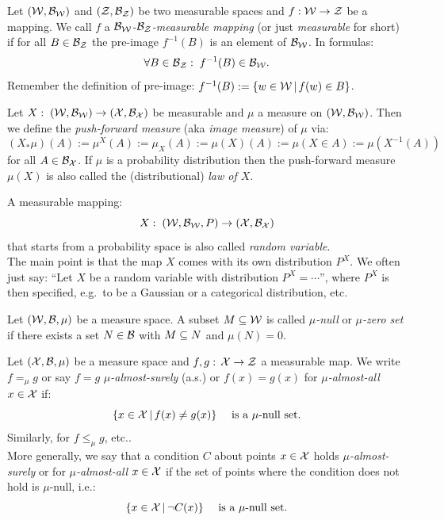 \begin{Def}
    \label{def-measurable-map}
    Let $(\mathcal{W},\mathcal{B}_{\mathcal{W}})$ and $(\mathcal{Z},\mathcal{B}_{\mathcal{Z}})$ be two measurable spaces and $f: \mathcal{W} \to \mathcal{Z}$ be a mapping.
    We call $f$ a \emph{$\mathcal{B}_{\mathcal{W}}$-$\mathcal{B}_{\mathcal{Z}}$-measurable mapping} (or just \emph{measurable} for short) if
    for all $B \in \mathcal{B}_{\mathcal{Z}}$ the pre-image $f^{-1}(B)$ is an element of $\mathcal{B}_{\mathcal{W}}$. In formulas:
    \[\forall B \in \mathcal{B}_{\mathcal{Z}}:\; f^{-1}(B) \in \mathcal{B}_{\mathcal{W}}.\]
    Remember the definition of pre-image: $f^{-1}(B) := \{ w\in \mathcal{W}\,|\, f(w) \in B \}$.
\end{Def}



\begin{Def}
    Let  $X:\; (\mathcal{W},\mathcal{B}_{\mathcal{W}}) \to (\mathcal{X},\mathcal{B}_{\mathcal{X}})$ be measurable and $\mu$ a measure on $(\mathcal{W},\mathcal{B}_{\mathcal{W}})$.
    Then we define the \emph{push-forward measure} (aka \emph{image measure}) of $\mu$ via:
    \[ (X_*\mu)(A):= \mu^X(A) := \mu_X(A) := \mu(X)(A):= \mu(X \in A):= \mu(X^{-1}(A))\]
    for all $A \in \mathcal{B}_{\mathcal{X}}$.
    If $\mu$ is a probability distribution then the push-forward measure $\mu(X)$ is also called the (distributional) \emph{law of $X$}.
\end{Def}


\begin{Def}
    A measurable mapping: \[X:\; (\mathcal{W},\mathcal{B}_{\mathcal{W}},P) \to (\mathcal{X},\mathcal{B}_{\mathcal{X}})\] 
    that starts from a probability space is also called \emph{random variable}.\\
    The main point is that the map $X$ comes with its own distribution $P^X$.
    We often just say: ``Let $X$ be a random variable with distribution $P^X = \cdots$'',
    where $P^X$ is then specified, e.g.\ to be a Gaussian or a categorical distribution, etc.
\end{Def}


\begin{Def}
    Let $(\mathcal{W},\mathcal{B},\mu)$ be a measure space.
    A subset $M \subseteq \mathcal{W}$ is called \emph{$\mu$-null} or \emph{$\mu$-zero set} if there exists a set $N \in \mathcal{B}$ with $M \subseteq N$ and $\mu(N)=0$.
\end{Def}

\begin{Def}
    Let $(\mathcal{X},\mathcal{B},\mu)$ be a measure space and $f,g:\,\mathcal{X} \to \mathcal{Z}$ a measurable map.
    We write $f=_\mu g$ or say $f=g$ \emph{$\mu$-almost-surely} (a.s.) or $f(x)=g(x)$ for \emph{$\mu$-almost-all} $x \in \mathcal{X}$ 
    if:  
    \[\{ x \in \mathcal{X}\,|\,f(x)\neq g(x) \} \quad \text{ is a $\mu$-null set.} \]
    Similarly, for $f\le_\mu g$, etc.. \\
    More generally,  we say that a condition $C$ about points $x \in \mathcal{X}$ holds \emph{$\mu$-almost-surely} or for \emph{$\mu$-almost-all} $x \in \mathcal{X}$ if the set of points where the condition does not hold is $\mu$-null, i.e.:
    \[\{ x \in \mathcal{X}\,|\,\neg C(x) \} \quad \text{ is a $\mu$-null set}. \]
\end{Def}

